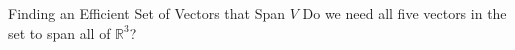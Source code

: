 \documentclass[xcolor=dvipsnames,aspectratio=169,t]{beamer}
\begin{document}
\begin{frame}{Finding an Efficient Set of Vectors that Span $V$}
\pause
\ii Do we need all five vectors in the set to span all of $\mathbb{R}^3$?
\ee



\end{frame} 
\end{document}
